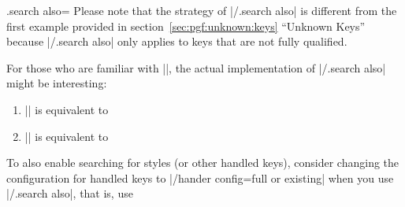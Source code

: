 \begin{handler}{{.search also}=}
  Please note that the strategy of |/.search also| is different from
  the first example provided in section~\ref{sec:pgf:unknown:keys}
  ``Unknown Keys'' because |/.search also| only applies to keys
  that are not fully qualified.
	
  For those who are familiar with |\pgfkeys|, the actual
  implementation of |/.search also| might be interesting:
  \begin{enumerate}
  \item || is equivalent to
\begin{codeexample}
\end{codeexample}
  \item || is equivalent to
\begin{codeexample}
\end{codeexample}
  \end{enumerate}

  To also enable searching for styles (or other handled keys),
  consider changing the configuration for handled keys to
  |/hander config=full or existing| when you use |/.search also|,
  that is, use
\begin{codeexample}
\end{codeexample}
\end{handler}


